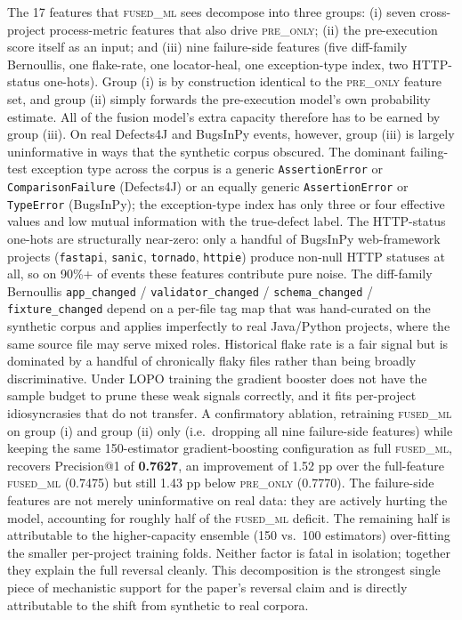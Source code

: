 \documentclass[preprint,12pt]{elsarticle}
\begin{document}
The 17 features that \textsc{fused\_ml} sees decompose into three groups: (i) seven cross-project process-metric features that also drive \textsc{pre\_only}; (ii) the pre-execution score itself as an input; and (iii) nine failure-side features (five diff-family Bernoullis, one flake-rate, one locator-heal, one exception-type index, two HTTP-status one-hots). Group (i) is by construction identical to the \textsc{pre\_only} feature set, and group (ii) simply forwards the pre-execution model's own probability estimate. All of the fusion model's extra capacity therefore has to be earned by group (iii). On real Defects4J and BugsInPy events, however, group (iii) is largely uninformative in ways that the synthetic corpus obscured. The dominant failing-test exception type across the corpus is a generic \texttt{AssertionError} or \texttt{ComparisonFailure} (Defects4J) or an equally generic \texttt{AssertionError} or \texttt{TypeError} (BugsInPy); the exception-type index has only three or four effective values and low mutual information with the true-defect label. The HTTP-status one-hots are structurally near-zero: only a handful of BugsInPy web-framework projects (\texttt{fastapi}, \texttt{sanic}, \texttt{tornado}, \texttt{httpie}) produce non-null HTTP statuses at all, so on 90\%+ of events these features contribute pure noise. The diff-family Bernoullis \texttt{app\_changed} / \texttt{validator\_changed} / \texttt{schema\_changed} / \texttt{fixture\_changed} depend on a per-file tag map that was hand-curated on the synthetic corpus and applies imperfectly to real Java/Python projects, where the same source file may serve mixed roles. Historical flake rate is a fair signal but is dominated by a handful of chronically flaky files rather than being broadly discriminative. Under LOPO training the gradient booster does not have the sample budget to prune these weak signals correctly, and it fits per-project idiosyncrasies that do not transfer. A confirmatory ablation, retraining \textsc{fused\_ml} on group (i) and group (ii) only (i.e.\ dropping all nine failure-side features) while keeping the same 150-estimator gradient-boosting configuration as full \textsc{fused\_ml}, recovers Precision@1 of \textbf{0.7627}, an improvement of 1.52 pp over the full-feature \textsc{fused\_ml} (0.7475) but still 1.43 pp below \textsc{pre\_only} (0.7770). The failure-side features are not merely uninformative on real data: they are actively hurting the model, accounting for roughly half of the \textsc{fused\_ml} deficit. The remaining half is attributable to the higher-capacity ensemble (150 vs.\ 100 estimators) over-fitting the smaller per-project training folds. Neither factor is fatal in isolation; together they explain the full reversal cleanly. This decomposition is the strongest single piece of mechanistic support for the paper's reversal claim and is directly attributable to the shift from synthetic to real corpora.
\end{document}
